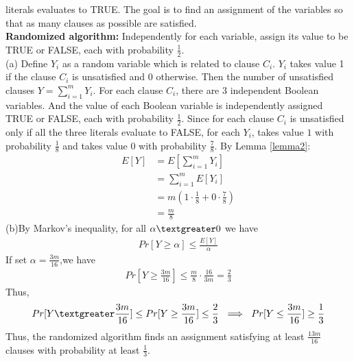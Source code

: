 literals evaluates to TRUE. The goal is to find an assignment of the variables so that as many clauses as possible are satisfied.\\
\textbf{Randomized algorithm:} Independently for each variable, assign its value to be TRUE or FALSE, each with probability $\frac{1}{2}$.\\
(a)
Define $Y_i$ as a random variable which is related to clause $C_i$. $Y_i$ takes value 1 if the clause $C_i$ is unsatisfied and 0 otherwise. Then the number of unsatisfied clauses $Y=\sum_{i=1}^{m}Y_i$. For each clause $C_i$, there are $3$ independent Boolean variables. And the value of each Boolean variable is independently assigned TRUE or FALSE, each with probability $\frac{1}{2}$. Since for each clause $C_i$ is unsatisfied only if all the three literals evaluate to FALSE, for each $Y_i$, takes value $1$ with probability $\frac{1}{8}$ and takes value $0$ with probability $\frac{7}{8}$. By Lemma \ref{lemma2}:
\begin{align}
    \nonumber E[Y]&=E[\sum_{i=1}^{m}Y_i]\\
    \nonumber&=\sum_{i=1}^mE[Y_i]\\
    \nonumber&=m(1\cdot \frac{1}{8}+0 \cdot \frac{7}{8})\\
    \nonumber&=\frac{m}{8}
\end{align}
(b)By Markov's inequality, for all $\alpha \textgreater 0$ we have
\begin{align}
   \nonumber Pr[Y\ge \alpha]\le \frac{E[Y]}{\alpha}
\end{align}
If set $\alpha=\frac{3m}{16}$,we have
\begin{align}
    \nonumber Pr[Y\ge \frac{3m}{16}]\le \frac{m}{8}\cdot \frac{16}{3m}=\frac{2}{3}
\end{align}
Thus, 
\begin{align}
    \nonumber Pr[Y\textgreater \frac{3m}{16}] \le Pr[Y\ge \frac{3m}{16}]\le \frac{2}{3} ~\implies~Pr[Y\le \frac{3m}{16}]\ge \frac{1}{3}
\end{align}
Thus, the randomized algorithm finds an assignment satisfying at least $\frac{13m}{16}$ clauses with probability at least $\frac{1}{3}$.\\
